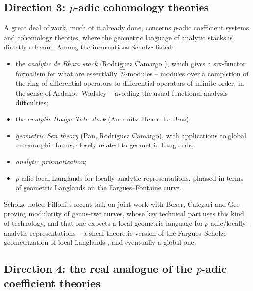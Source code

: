 \subsection{Direction 3: \texorpdfstring{$p$}{p}-adic cohomology theories}
\label{subsec:24:p-adic}

A great deal of work, much of it already done, concerns $p$-adic coefficient
systems and cohomology theories, where the geometric language of analytic stacks
is directly relevant. Among the incarnations Scholze listed:
\begin{itemize}
\item the \emph{analytic de Rham stack} (Rodr\'iguez Camargo
\cite{camargo2024analyticrhamstackrigid}), which gives a six-functor formalism
for what are essentially $\widehat{\mathcal D}$-modules -- modules over a
completion of the ring of differential operators to differential operators of
infinite order, in the sense of Ardakov--Wadsley -- avoiding the usual
functional-analysis difficulties;
\item the \emph{analytic Hodge--Tate stack} (Anschütz--Heuer--Le Bras);
\item \emph{geometric Sen theory} (Pan, Rodr\'iguez Camargo), with applications
to global automorphic forms, closely related to geometric Langlands;
\item \emph{analytic prismatization};
\item $p$-adic local Langlands for locally analytic representations, phrased in
terms of geometric Langlands on the Fargues--Fontaine curve.
\end{itemize}
Scholze noted Pilloni's recent talk on joint work with Boxer, Calegari and Gee
proving modularity of genus-two curves, whose key technical part uses this kind
of technology, and that one expects a local geometric language for
$p$-adic/locally-analytic representations -- a sheaf-theoretic version of the
Fargues--Scholze geometrization of local Langlands
\cite{fargues2024geometrizationlocallanglandscorrespondence}, and eventually a
global one.

\subsection{Direction 4: the real analogue of the
\texorpdfstring{$p$}{p}-adic coefficient theories}
\label{subsec:24:real}


